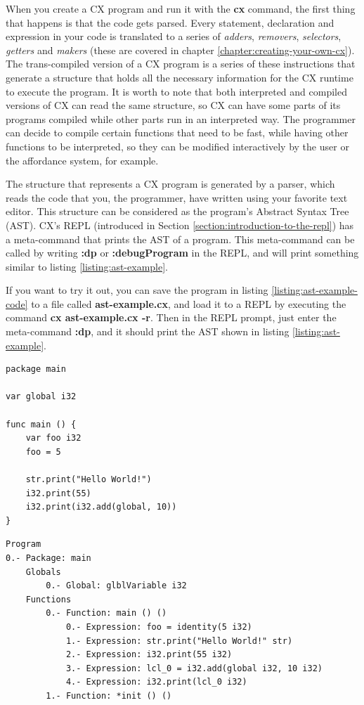 \documentclass[11pt,fleqn,openany]{book} %
\begin{document}
When you create a CX program and run it with the \textbf{cx} command, the first thing that happens is that the code gets parsed. Every statement, declaration and expression in your code is translated to a series of \textit{adders}, \textit{removers}, \textit{selectors}, \textit{getters} and \textit{makers} (these are covered in chapter \ref{chapter:creating-your-own-cx}). The trans-compiled version of a CX program is a series of these instructions that generate a structure that holds all the necessary information for the CX runtime to execute the program. It is worth to note that both interpreted and compiled versions of CX can read the same structure, so CX can have some parts of its programs compiled while other parts run in an interpreted way. The programmer can decide to compile certain functions that need to be fast, while having other functions to be interpreted, so they can be modified interactively by the user or the affordance system, for example.

The structure that represents a CX program is generated by a parser, which reads the code that you, the programmer, have written using your favorite text editor. This structure can be considered as the program's Abstract Syntax Tree (AST). CX's REPL (introduced in Section \ref{section:introduction-to-the-repl}) has a meta-command that prints the AST of a program. This meta-command can be called by writing \textbf{:dp} or \textbf{:debugProgram} in the REPL, and will print something similar to listing \ref{listing:ast-example}.

If you want to try it out, you can save the program in listing \ref{listing:ast-example-code} to a file called \textbf{ast-example.cx}, and load it to a REPL by executing the command \textbf{cx ast-example.cx -r}. Then in the REPL prompt, just enter the meta-command \textbf{:dp}, and it should print the AST shown in listing \ref{listing:ast-example}.
        
\begin{lstlisting}[caption={Abstract syntax tree example - code},captionpos=b,label={listing:ast-example-code}]
package main

var global i32

func main () {
	var foo i32
	foo = 5
	
 	str.print("Hello World!")
	i32.print(55)
	i32.print(i32.add(global, 10))
}
\end{lstlisting}

\begin{lstlisting}[caption={Abstract syntax tree example},captionpos=b,label={listing:ast-example}]
Program
0.- Package: main
	Globals
		0.- Global: glblVariable i32
	Functions
		0.- Function: main () ()
			0.- Expression: foo = identity(5 i32)
			1.- Expression: str.print("Hello World!" str)
			2.- Expression: i32.print(55 i32)
			3.- Expression: lcl_0 = i32.add(global i32, 10 i32)
			4.- Expression: i32.print(lcl_0 i32)
		1.- Function: *init () ()
\end{lstlisting}
\end{document}

